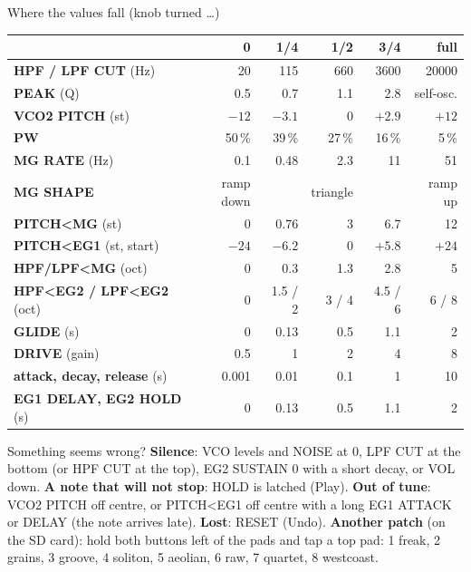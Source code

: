 \documentclass{article}
\newcommand{\MD}[1]{\textcolor{modc}{#1}}
\newcommand{\FX}[1]{\textcolor{fxc}{#1}}
\newcommand{\VC}[1]{\textcolor{vcoc}{#1}}
\newcommand{\FL}[1]{\textcolor{fltc}{#1}}
\newcommand{\EG}[1]{\textcolor{egc}{#1}}
\begin{document}
\begin{minipage}[t]{128mm}\vspace{0pt}
\begin{card}{Where the values fall (knob turned \dots)}
\fontsize{7.5}{9.2}\selectfont
\setlength{\tabcolsep}{3pt}
\begin{tabular}{@{}l r r r r r@{}}
 & 0 & 1/4 & 1/2 & 3/4 & full \\ \hline
\FL{\textbf{HPF / LPF CUT}} (Hz) & 20 & 115 & 660 & 3600 & 20000 \\
\FL{\textbf{PEAK}} (Q) & 0.5 & 0.7 & 1.1 & 2.8 & self-osc. \\
\VC{\textbf{VCO2 PITCH}} (st) & \(-12\) & \(-3.1\) & 0 & \(+2.9\) & \(+12\) \\
\VC{\textbf{PW}} & 50\,\% & 39\,\% & 27\,\% & 16\,\% & 5\,\% \\
\MD{\textbf{MG RATE}} (Hz) & 0.1 & 0.48 & 2.3 & 11 & 51 \\
\MD{\textbf{MG SHAPE}} & ramp down & & triangle & & ramp up \\
\MD{\textbf{PITCH<MG}} (st) & 0 & 0.76 & 3 & 6.7 & 12 \\
\MD{\textbf{PITCH<EG1}} (st, start) & \(-24\) & \(-6.2\) & 0 & \(+5.8\) & \(+24\) \\
\MD{\textbf{HPF/LPF<MG}} (oct) & 0 & 0.3 & 1.3 & 2.8 & 5 \\
\MD{\textbf{HPF<EG2 / LPF<EG2}} (oct) & 0 & 1.5 / 2 & 3 / 4 & 4.5 / 6 & 6 / 8 \\
\FX{\textbf{GLIDE}} (s) & 0 & 0.13 & 0.5 & 1.1 & 2 \\
\FX{\textbf{DRIVE}} (gain) & 0.5 & 1 & 2 & 4 & 8 \\
\EG{\textbf{attack, decay, release}} (s) & 0.001 & 0.01 & 0.1 & 1 & 10 \\
\EG{\textbf{EG1 DELAY, EG2 HOLD}} (s) & 0 & 0.13 & 0.5 & 1.1 & 2 \\
\end{tabular}
\end{card}

\begin{card}{Something seems wrong?}
\fontsize{7.5}{9.2}\selectfont
\textbf{Silence}: VCO levels and NOISE at 0, LPF CUT at the bottom (or HPF CUT at the top), EG2 SUSTAIN 0 with a
short decay, or VOL down.\quad
\textbf{A note that will not stop}: HOLD is latched (Play).\quad
\textbf{Out of tune}: VCO2 PITCH off centre, or PITCH<EG1 off centre with a long EG1 ATTACK or DELAY (the note arrives late).\quad
\textbf{Lost}: RESET (Undo).\quad
\textbf{Another patch} (on the SD card): hold both buttons left of the pads and tap a top pad: 1 freak, 2 grains, 3 groove, 4 soliton, 5 aeolian, 6 raw, 7 quartet, 8 westcoast.
\end{card}
\end{minipage}
\end{document}

